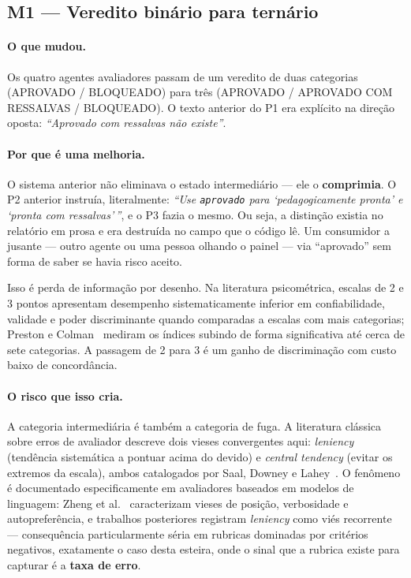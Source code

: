 \documentclass[11pt,a4paper]{article}
\newcommand{\cod}[1]{\texttt{\small #1}}
\begin{document}
\subsection{M1 --- Veredito binário para ternário}
\label{sec:m1}

\paragraph{O que mudou.} Os quatro agentes avaliadores passam de um veredito de duas categorias
(APROVADO / BLOQUEADO) para três (APROVADO / APROVADO COM RESSALVAS / BLOQUEADO). O texto anterior do P1
era explícito na direção oposta: \textit{``Aprovado com ressalvas não existe''}.

\paragraph{Por que é uma melhoria.} O sistema anterior não eliminava o estado intermediário --- ele o
\textbf{comprimia}. O P2 anterior instruía, literalmente: \textit{``Use \cod{aprovado} para `pedagogicamente
pronta' e `pronta com ressalvas'\,''}, e o P3 fazia o mesmo. Ou seja, a distinção existia no relatório em
prosa e era destruída no campo que o código lê. Um consumidor a jusante --- outro agente ou uma pessoa
olhando o painel --- via ``aprovado'' sem forma de saber se havia risco aceito.

Isso é perda de informação por desenho. Na literatura psicométrica, escalas de 2 e 3 pontos apresentam
desempenho sistematicamente inferior em confiabilidade, validade e poder discriminante quando comparadas a
escalas com mais categorias; Preston e Colman~\cite{preston2000} mediram os índices subindo de forma
significativa até cerca de sete categorias. A passagem de 2 para 3 é um ganho de discriminação com custo
baixo de concordância.

\paragraph{O risco que isso cria.} A categoria intermediária é também a categoria de fuga. A literatura
clássica sobre erros de avaliador descreve dois vieses convergentes aqui: \textit{leniency} (tendência
sistemática a pontuar acima do devido) e \textit{central tendency} (evitar os extremos da escala), ambos
catalogados por Saal, Downey e Lahey~\cite{saal1980}. O fenômeno é documentado especificamente em
avaliadores baseados em modelos de linguagem: Zheng et al.~\cite{zheng2023} caracterizam vieses de posição,
verbosidade e autopreferência, e trabalhos posteriores registram \textit{leniency} como viés recorrente ---
consequência particularmente séria em rubricas dominadas por critérios negativos, exatamente o caso desta
esteira, onde o sinal que a rubrica existe para capturar é a \textbf{taxa de erro}.
\end{document}
